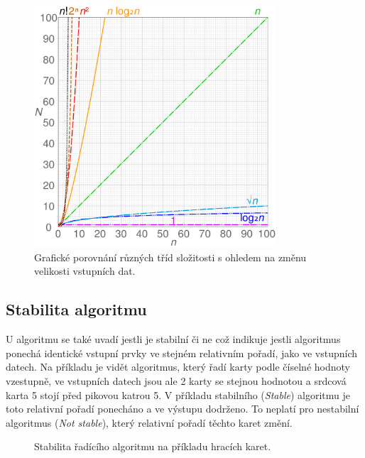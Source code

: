 \documentclass{article}
\begin{document}
\begin{figure}[H]
    \begin{center}
        \includegraphics[width=9cm]{img/big_o_graph.png}
        \caption{Grafické porovnání různých tříd složitosti s ohledem na změnu velikosti vstupních dat. \cite{wiki:bigo}}
        \label{imageLabel}
    \end{center}
\end{figure}

\subsection{Stabilita algoritmu}
U algoritmu se také uvadí jestli je stabilní či ne což indikuje jestli algoritmus ponechá identické vstupní prvky ve stejném relativním pořadí, jako ve vstupních datech. Na příkladu je vidět algoritmus, který řadí karty podle číselné hodnoty vzestupně, ve vstupních datech jsou ale 2 karty se stejnou hodnotou a srdcová karta 5 stojí před pikovou katrou 5. V příkladu stabilního (\textit{Stable}) algoritmu je toto relativní pořadí ponecháno a ve výstupu dodrženo. To neplatí pro nestabilní algoritmus (\textit{Not stable}), který relativní pořadí těchto karet změní.

\begin{figure}[H]
    \begin{center}
        
        \caption{Stabilita řadícího algoritmu na příkladu hracích karet.
        \cite{wiki:cards}}
        \label{imageLabel}
    \end{center}
\end{figure}
\end{document}
